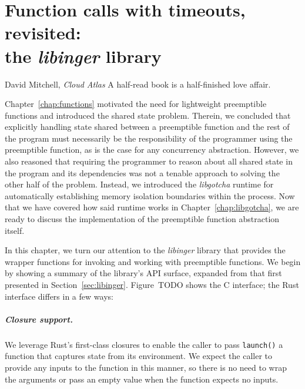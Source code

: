 \chapter{Function calls with timeouts, revisited: \\ the \textit{libinger} library}
\label{chap:libinger}

\ifdefined\chapquotes
\vspace{-0.5in}
\begin{chapquote}[1.5in]{David Mitchell, \textit{Cloud Atlas}}
A half-read book is a half-finished love affair.
\end{chapquote}
\fi

Chapter~\ref{chap:functions} motivated the need for lightweight preemptible functions
and introduced the shared state problem.  Therein, we concluded that explicitly
handling state shared between a preemptible function and the rest of the program must
necessarily be the responsibility of the programmer using the preemptible function,
as is the case for any concurrency abstraction.  However, we also reasoned that
requiring the programmer to reason about all shared state in the program and its
dependencies was not a tenable approach to solving the other half of the problem.
Instead, we introduced the \textit{libgotcha} runtime for automatically establishing
memory isolation boundaries within the process.  Now that we have covered how said
runtime works in Chapter~\ref{chap:libgotcha}, we are ready to discuss the
implementation of the preemptible function abstraction itself.

In this chapter, we turn our attention to the \textit{libinger} library that provides
the wrapper functions for invoking and working with preemptible functions.  We begin
by showing a summary of the library's API surface, expanded from that first presented
in Section~\ref{sec:libinger}.  Figure~TODO shows the C interface; the Rust interface
differs in a few ways:


\paragraph{Closure support.}
We leverage Rust's first-class closures to enable the caller to pass
\texttt{launch()} a function that captures state from its environment.  We expect the
caller to provide any inputs to the function in this manner, so there is no need to
wrap the arguments or pass an empty value when the function expects no inputs.


